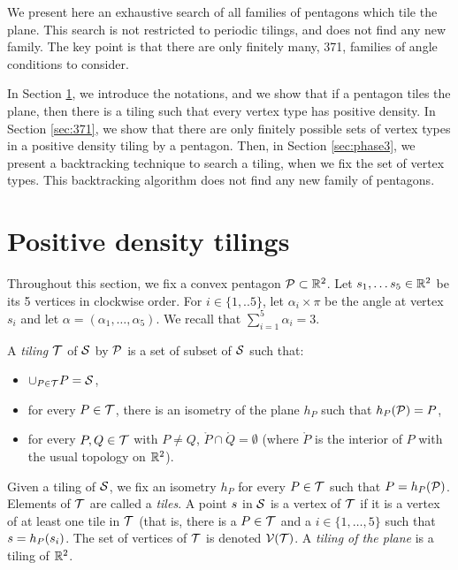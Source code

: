 \documentclass[11pt]{article}
\theoremstyle{definition}
\begin{document}
We present here an exhaustive search of all families of pentagons which tile the plane. This search is not restricted to periodic tilings, and does not find any new family.
The key point is that there are only finitely many, 371, families of angle conditions to consider.

In Section \ref{sec:positive}, we introduce the notations, and we show that if a pentagon tiles the plane, then there is a tiling such that every vertex type has positive density.
In Section \ref{sec:371}, we show that there are only finitely possible sets of vertex types in a positive density tiling by a pentagon.
Then, in Section \ref{sec:phase3}, we present a backtracking technique to search a tiling, when we fix the set of vertex types.
This backtracking algorithm does not find any new family of pentagons. 

\section{Positive density tilings}\label{sec:positive}

%

Throughout this section, we fix a convex pentagon $\mathcal{P}\subset\mathbb{R}^2$.
Let $s_1,\ldots s_5 \in \mathbb{R}^2$ be its 5 vertices in clockwise order.
For $i\in \{1,..5\}$, let $\alpha_i\times\pi$ be the angle at vertex $s_i$
and let $\alpha=(\alpha_1,\ldots, \alpha_5)$.
We recall that $\sum_{i=1}^5 \alpha_i = 3$.

A \emph{tiling} $\mathcal{T}$ of $\mathcal{S}$ by $\mathcal{P}$ is a set of subset of $\mathcal{S}$ such that:
\begin{itemize}
\item $\cup_{P\in \mathcal{T}} P = \mathcal{S}$,
\item for every $P\in \mathcal{T}$, there is an isometry of the plane $h_P$ such that $h_P(\mathcal{P})=P$,
\item for every $P,Q\in \mathcal{T}$ with $P\ne Q$, $\mathring{P} \cap \mathring{Q} = \emptyset$ (where $\mathring{P}$ is the interior of $P$ with the usual topology on $\mathbb{R}^2$).
\end{itemize}
Given a tiling of $\mathcal{S}$, we fix an isometry $h_P$ for every $P\in \mathcal{T}$ such that $P=h_P(\mathcal{P})$. %
Elements of $\mathcal{T}$ are called a \emph{tiles}.
A point $s$ in $\mathcal{S}$ is a vertex of $\mathcal{T}$ if it is a vertex of at least one tile in $\mathcal{T}$ (that is, there is a $P\in \mathcal{T}$ and a $i\in\{1,\ldots,5\}$ such that $s = h_P(s_i)$.
The set of vertices of $\mathcal{T}$ is denoted $\mathcal{V}(\mathcal{T})$.
A \emph{tiling of the plane} is a tiling of $\mathbb{R}^2$.
\end{document}
